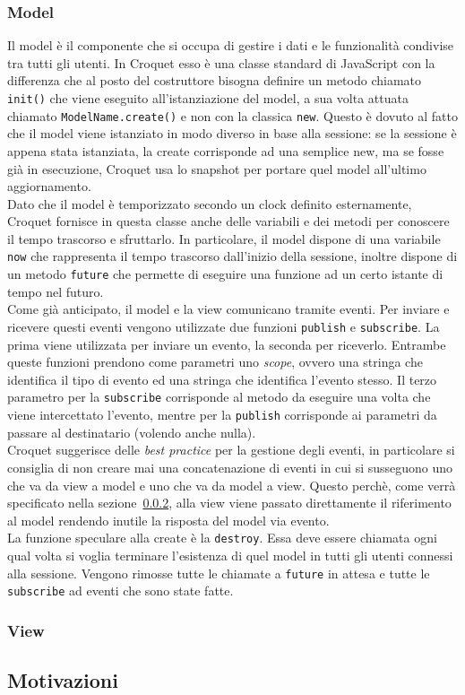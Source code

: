 \subsubsection{Model}\label{subsubsec:Croquet_model}
Il model è il componente che si occupa di gestire i dati e le funzionalità condivise tra tutti gli utenti. In Croquet esso è una classe standard di JavaScript con la differenza
che al posto del costruttore bisogna definire un metodo chiamato \texttt{init()} che viene eseguito all'istanziazione del model, a sua volta attuata chiamato \texttt{ModelName.create()}
e non con la classica \texttt{new}. Questo è dovuto al fatto che il model viene istanziato in modo diverso in base alla sessione: se la sessione è appena stata istanziata, la create
corrisponde ad una semplice new, ma se fosse già in esecuzione, Croquet usa lo snapshot per portare quel model all'ultimo aggiornamento.\\
\newline
Dato che il model è temporizzato secondo un clock definito esternamente, Croquet fornisce in questa classe anche delle variabili e dei metodi per conoscere il tempo trascorso e 
sfruttarlo. In particolare, il model dispone di una variabile \texttt{now} che rappresenta il tempo trascorso dall'inizio della sessione, inoltre dispone di un metodo \texttt{future}
che permette di eseguire una funzione ad un certo istante di tempo nel futuro.\\
\newline
Come già anticipato, il model e la view comunicano tramite eventi. Per inviare e ricevere questi eventi vengono utilizzate due funzioni \texttt{publish} e \texttt{subscribe}. La prima
viene utilizzata per inviare un evento, la seconda per riceverlo. Entrambe queste funzioni prendono come parametri uno \textit{scope}, ovvero una stringa che identifica il tipo di
evento ed una stringa che identifica l'evento stesso. Il terzo parametro per la \texttt{subscribe} corrisponde al metodo da eseguire una volta che viene intercettato l'evento, mentre per la
\texttt{publish} corrisponde ai parametri da passare al destinatario (volendo anche nulla).\\
Croquet suggerisce delle \textit{best practice} per la gestione degli eventi, in particolare si consiglia di non creare mai una concatenazione di eventi in cui si susseguono uno
che va da view a model e uno che va da model a view. Questo perchè, come verrà specificato nella sezione~\ref{subsubsec:Croquet_view}, alla view viene passato direttamente il riferimento
al model rendendo inutile la risposta del model via evento.\\
\newline
La funzione speculare alla create è la \texttt{destroy}. Essa deve essere chiamata ogni qual volta si voglia terminare l'esistenza di quel model in tutti gli utenti connessi alla
sessione. Vengono rimosse tutte le chiamate a \texttt{future} in attesa e tutte le \texttt{subscribe} ad eventi che sono state fatte.\\

\subsubsection{View}\label{subsubsec:Croquet_view}
\subsection{Motivazioni}\label{subsec:Croquet_motivazioni}